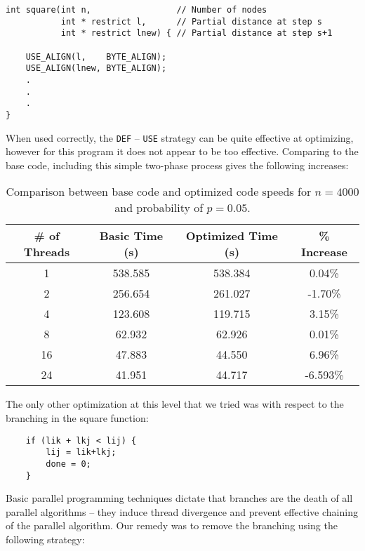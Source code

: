 \documentclass[11pt]{article}
\begin{document}
\begin{lstlisting}
int square(int n,                 // Number of nodes
           int * restrict l,      // Partial distance at step s
           int * restrict lnew) { // Partial distance at step s+1

    USE_ALIGN(l,    BYTE_ALIGN);
    USE_ALIGN(lnew, BYTE_ALIGN);
    .
    .
    .
}
\end{lstlisting}

\noindent When used correctly, the \texttt{DEF} -- \texttt{USE} strategy can be quite effective at optimizing, however for this program it does not appear to be too effective.  Comparing to the base code, including this simple two-phase process gives the following increases:
\begin{table}[h]
	\begin{center}
		\begin{tabular}{|c| c| c| c|}
			\hline
			\# of Threads & Basic Time (s) & Optimized Time (s) & \% Increase \\ \hline
			1 &  538.585 & 538.384 & 0.04\%	\\ \hline
			2 &  256.654 &  261.027& -1.70\%	\\ \hline
			4 & 123.608  & 119.715 & 3.15\%	\\ \hline
			8 & 62.932  & 62.926 & 	0.01\%	\\ \hline
			16 & 47.883  & 44.550& 	6.96\%	\\ \hline
			24 & 41.951 & 44.717 & 	-6.593\%	\\ \hline
						
		\end{tabular}
	\end{center}
	\caption{Comparison between base code and optimized code speeds for $n = 4000$ and probability of $p = 0.05$.}
\end{table}


\noindent The only other optimization at this level that we tried was with respect to the branching in the square function:

\begin{lstlisting}
    if (lik + lkj < lij) {
        lij = lik+lkj;
        done = 0;
    }
\end{lstlisting}

\noindent Basic parallel programming techniques dictate that branches are the death of all parallel algorithms -- they induce thread divergence and prevent effective chaining of the parallel algorithm.  Our remedy was to remove the branching using the following strategy:
\end{document}
